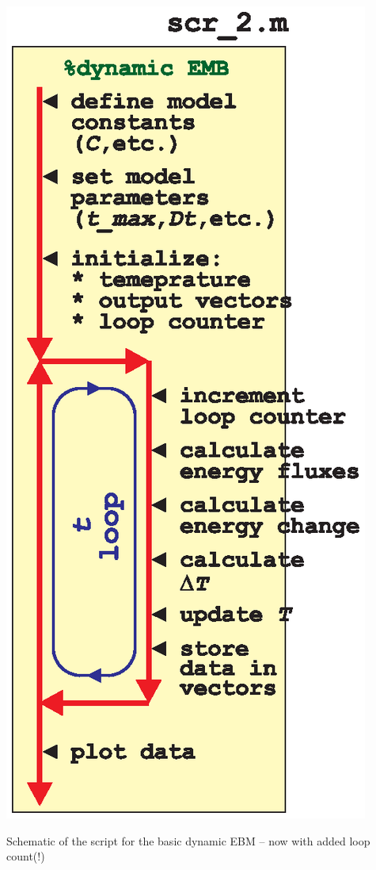 \documentclass{tufte-book} %
\begin{document}
\begin{marginfigure}[-1.0in]
\includegraphics[width=\linewidth]{ch9-schematic-scr2.eps}
\caption{Schematic of the script for the basic dynamic EBM -- now with added loop count(!)}
\label{fig:ch9-schematic-scr2}
\end{marginfigure}
\end{document}
